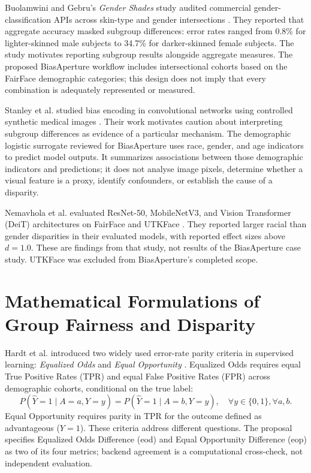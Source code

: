 Buolamwini and Gebru's \emph{Gender Shades} study audited commercial gender-classification APIs across skin-type and gender intersections \cite{buolamwini2018gendershades}. They reported that aggregate accuracy masked subgroup differences: error rates ranged from 0.8\% for lighter-skinned male subjects to 34.7\% for darker-skinned female subjects. The study motivates reporting subgroup results alongside aggregate measures. The proposed BiasAperture workflow includes intersectional cohorts based on the FairFace demographic categories; this design does not imply that every combination is adequately represented or measured.

Stanley et al. studied bias encoding in convolutional networks using controlled synthetic medical images \cite{stanley2025bias}. Their work motivates caution about interpreting subgroup differences as evidence of a particular mechanism. The demographic logistic surrogate reviewed for BiasAperture uses race, gender, and age indicators to predict model outputs. It summarizes associations between those demographic indicators and predictions; it does not analyse image pixels, determine whether a visual feature is a proxy, identify confounders, or establish the cause of a disparity.

Nemavhola et al. evaluated ResNet-50, MobileNetV3, and Vision Transformer (DeiT) architectures on FairFace and UTKFace \cite{nemavhola2026reassessing}. They reported larger racial than gender disparities in their evaluated models, with reported effect sizes above \(d=1.0\). These are findings from that study, not results of the BiasAperture case study. UTKFace was excluded from BiasAperture's completed scope.


\section{Mathematical Formulations of Group Fairness and Disparity}
\label{sec:lit_fairness_math}

Hardt et al. introduced two widely used error-rate parity criteria in supervised learning: \emph{Equalized Odds} and \emph{Equal Opportunity} \cite{hardt2016equality}. Equalized Odds requires equal True Positive Rates (TPR) and equal False Positive Rates (FPR) across demographic cohorts, conditional on the true label:
\begin{equation}
    P(\hat{Y} = 1 \mid A = a, Y = y) = P(\hat{Y} = 1 \mid A = b, Y = y), \quad \forall y \in \{0, 1\}, \forall a, b.
\end{equation}
Equal Opportunity requires parity in TPR for the outcome defined as advantageous ($Y=1$). These criteria address different questions. The proposal specifies Equalized Odds Difference (\gls{eod}) and Equal Opportunity Difference (\gls{eop}) as two of its four metrics; backend agreement is a computational cross-check, not independent evaluation.

